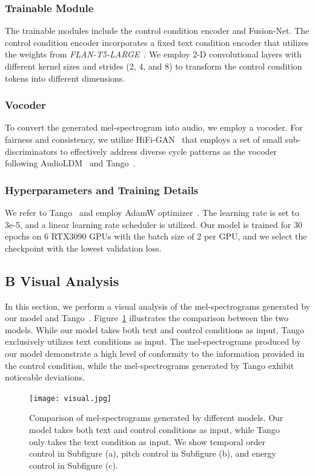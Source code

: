 \documentclass[letterpaper]{article} %
\begin{document}
\subsubsection{Trainable Module} The trainable modules include the control condition encoder and Fusion-Net. The control condition encoder incorporates a fixed text condition encoder that utilizes the weights from \textit{FLAN-T5-LARGE}~\cite{chung2022siflm}.  We employ 2-D convolutional layers with different kernel sizes and strides (2, 4, and 8) to transform the control condition tokens into different dimensions.

\subsubsection{Vocoder} To convert the generated mel-spectrogram into audio, we employ a vocoder. For fairness and consistency, we utilize HiFi-GAN~\cite{kong2020hifigan} that employs a set of small sub-discriminators to effectively address diverse cycle patterns as the vocoder following AudioLDM~\cite{liu2023audioldm} and Tango~\cite{ghosal2023tango}.

\subsubsection{Hyperparameters and Training Details} We refer to Tango~\cite{ghosal2023tango} and employ AdamW optimizer~\cite{loshchilov2017decoupledwd}. The learning rate is set to 3e-5, and a linear learning rate scheduler is utilized. Our model is trained for 30 epochs on 6 RTX3090 GPUs with the batch size of 2 per GPU, and we select the checkpoint with the lowest validation loss.

\subsection{B Visual Analysis}

In this section, we perform a visual analysis of the mel-spectrograms generated by our model and Tango~\cite{choi2018stargan}. Figure~\ref{visual} illustrates the comparison between the two models. While our model takes both text and control conditions as input, Tango exclusively utilizes text conditions as input. The mel-spectrograms produced by our model demonstrate a high level of conformity to the information provided in the control condition, while the mel-spectrograms generated by Tango exhibit noticeable deviations.

\begin{figure}[!t]
    \centering
    \texttt{[image: visual.jpg]}
    \caption{Comparison of mel-spectrograms generated by different models. Our model takes both text and control conditions as input, while Tango only takes the text condition as input. We show temporal order control in Subfigure (a), pitch control in Subfigure (b), and energy control in Subfigure (c).}
    \label{visual}
    \vspace{-4pt}
\end{figure}


\end{document}
